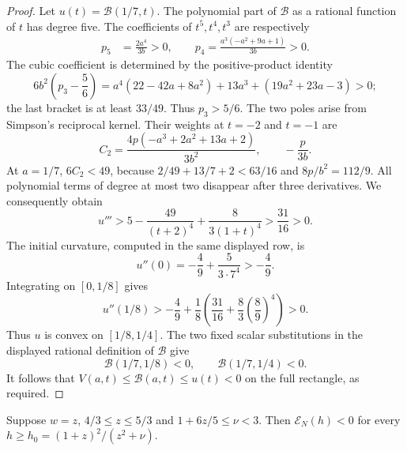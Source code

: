 \begin{proof}
Let $u(t)=\mathcal B(1/7,t)$. The polynomial part of $\mathcal B$
as a rational function of $t$ has degree five. The coefficients of
$t^5,t^4,t^3$ are respectively
\begin{align*}
 p_5&=\frac{2a^4}{3b}>0,\qquad
 p_4=\frac{a^3(-a^2+9a+1)}{3b}>0.
\end{align*}
The cubic coefficient is determined by the positive-product identity
\[
 6b^2\left(p_3-\frac56\right)
 =a^4(22-42a+8a^2)+13a^3+(19a^2+23a-3)>0;
\]
the last bracket is at least $33/49$. Thus $p_3>5/6$.
The two poles arise from Simpson's reciprocal kernel. Their weights
at $t=-2$ and $t=-1$ are
\[
 C_2=\frac{4p(-a^3+2a^2+13a+2)}{3b^2},\qquad -\frac p{3b}.
\]
At $a=1/7$, $6C_2<49$, because
$2/49+13/7+2<63/16$ and $8p/b^2=112/9$.
All polynomial terms of degree at most two disappear after three
derivatives. We consequently obtain
\[
 u'''>5-\frac{49}{(t+2)^4}+\frac8{3(1+t)^4}>\frac{31}{16}>0.
\]
The initial curvature, computed in the same displayed row, is
\[
 u''(0)=-\frac49+\frac5{3\cdot7^4}>-\frac49.
\]
Integrating on $[0,1/8]$ gives
\[
 u''(1/8)>-\frac49+\frac18
       \left(\frac{31}{16}+\frac83\left(\frac89\right)^4\right)>0.
\]
Thus $u$ is convex on $[1/8,1/4]$. The two fixed scalar substitutions
in the displayed rational definition of $\mathcal B$ give
\[
 \mathcal B(1/7,1/8)<0,\qquad\mathcal B(1/7,1/4)<0.
\]
It follows that $V(a,t)\leq\mathcal B(a,t)\leq u(t)<0$ on the full
rectangle, as required.
\end{proof}

\begin{lemma}\label{lem:fwd-neighbour-symmetric}
Suppose $w=z$, $4/3\leq z\leq5/3$ and $1+6z/5\leq\nu<3$.
Then $\mathcal E_N(h)<0$ for every $h\geq h_0=(1+z)^2/(z^2+\nu)$.
\end{lemma}

